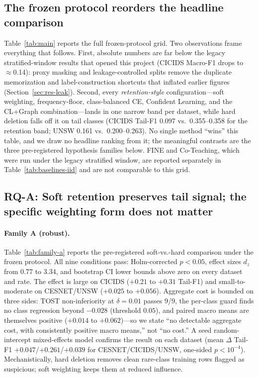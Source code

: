 \documentclass[pdflatex,referee,lineno,sn-basic,Numbered]{sn-jnl}
\begin{document}
\subsection{The frozen protocol reorders the headline comparison}
\label{sec:res-aggregate}
Table~\ref{tab:main} reports the full frozen-protocol grid. Two observations
frame everything that follows. First, absolute numbers are far below the
legacy stratified-window results that opened this project (CICIDS Macro-F1
drops to $\approx$0.14): proxy masking and leakage-controlled splits remove the
duplicate memorization and label-construction shortcuts that inflated earlier
figures (Section~\ref{sec:res-leak}). Second, every \emph{retention-style}
configuration---soft weighting, frequency-floor, class-balanced CE, Confident
Learning, and the CL{+}Graph combination---lands in one narrow band per
dataset, while hard deletion falls off it on tail classes (CICIDS Tail-F1
0.097 vs.\ 0.355--0.358 for the retention band; UNSW 0.161 vs.\
0.200--0.263). No single method ``wins'' this table, and we draw no headline
ranking from it; the meaningful contrasts are the three pre-registered
hypothesis families below. FINE and Co-Teaching, which were run under the
legacy stratified window, are reported separately in
Table~\ref{tab:baselines-iid} and are not comparable to this grid.




\subsection{RQ-A: Soft retention preserves tail signal; the specific weighting form does not matter}
\label{sec:res-tail}
\paragraph{Family A (robust).}
Table~\ref{tab:family-a} reports the pre-registered soft-vs.-hard comparison
under the frozen protocol. All nine conditions pass: Holm-corrected $p<0.05$,
effect sizes $d_z$ from 0.77 to 3.34, and bootstrap CI lower bounds above zero
on every dataset and rate. The effect is large on CICIDS ($+0.21$ to $+0.31$
Tail-F1) and small-to-moderate on CESNET/UNSW ($+0.025$ to $+0.056$). Aggregate
cost is bounded on three sides: TOST non-inferiority at $\delta{=}0.01$ passes
9/9, the per-class guard finds no class regression beyond $-0.028$
(threshold $0.05$), and paired macro means are themselves positive
($+0.014$ to $+0.062$)---so we state ``no detectable aggregate cost, with
consistently positive macro means,'' not ``no cost.'' A seed random-intercept
mixed-effects model confirms the result on each dataset (mean $\Delta$ Tail-F1
$+0.047$/$+0.261$/$+0.039$ for CESNET/CICIDS/UNSW, one-sided $p<10^{-4}$).
Mechanistically, hard deletion removes clean rare-class training rows flagged
as suspicious; soft weighting keeps them at reduced influence.
\end{document}
